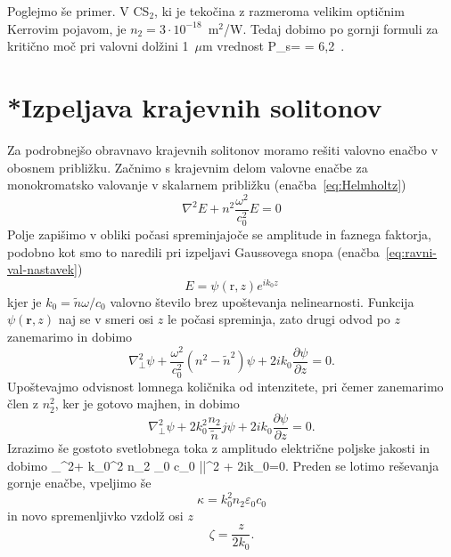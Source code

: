 Poglejmo še primer. V CS$_{2}$, ki je tekočina z razmeroma velikim optičnim
Kerrovim pojavom, je $n_{2}=3 \cdot 10^{-18}$~m$^{2}$/W. Tedaj dobimo
po gornji formuli za kritično moč pri valovni dolžini 1~$\mu$m vrednost 
\beq
P_{s}= = 6,2~.
\eeq

\section{*Izpeljava krajevnih solitonov}
\label{chap:ks}
Za podrobnejšo obravnavo krajevnih solitonov moramo rešiti valovno 
enačbo v obosnem približku. Začnimo s krajevnim delom valovne 
enačbe za monokromatsko valovanje v skalarnem približku (enačba~\ref{eq:Helmholtz})
\begin{equation}
\nabla^{2}E+n^{2}\frac{\omega^{2}}{c_0^{2}}E=0
\label{8.80}
\end{equation}
Polje zapišimo v obliki počasi spreminjajoče se amplitude in faznega faktorja, podobno kot 
smo to naredili pri izpeljavi Gaussovega snopa (enačba~\ref{eq:ravni-val-nastavek})
\begin{equation}
E=\psi(\mathrm{r},z)e^{ik_{0}z}
\label{8.81}
\end{equation}
 kjer je $k_{0}=\tilde{n}\omega/c_0$ valovno število brez upoštevanja nelinearnosti.
Funkcija $\psi(\mathbf{r},z)$ naj se v smeri osi $z$ le počasi spreminja, zato drugi odvod
po $z$ zanemarimo in dobimo 
\begin{equation}
\nabla_{\bot}^{2}\psi+\frac{\omega^{2}}{c_0^{2}}(n^{2}-\tilde{n}^{2})\psi+2ik_{0}
\frac{\partial\psi}{\partial z}=0.
\label{8.82}
\end{equation}
Upoštevajmo odvisnost lomnega količnika od intenzitete, pri čemer
zanemarimo člen z $n_{2}^{2}$, ker je gotovo majhen, in dobimo
\begin{equation}
\nabla_{\bot}^{2}\psi+2k_{0}^{2}\frac{n_{2}}{\tilde{n}}j\psi+2ik_{0}\frac{\partial\psi}{\partial z}=0.
\label{8.83}
\end{equation}
Izrazimo še gostoto svetlobnega toka z amplitudo električne poljske jakosti in dobimo
\beq
\nabla_{\bot}^{2}\psi+
k_{0}^{2} n_2 \varepsilon_0 c_0 |\psi|^2 \psi+
2ik_{0}=0.
\label{8.83a}
\eeq
Preden se lotimo reševanja gornje enačbe, vpeljimo še
\begin{equation}
\kappa=k_{0}^{2} n_2 \varepsilon_0 c_0
\end{equation}
 in novo spremenljivko vzdolž osi $z$
\begin{equation}
\zeta=\frac{z}{2k_{0}}.
\end{equation}
